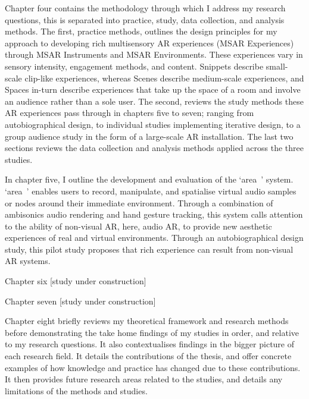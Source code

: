 Chapter four contains the methodology through which I address my research questions, this is separated into practice, study, data collection, and analysis methods. The first, practice methods, outlines the design principles for my approach to developing rich multisensory AR experiences (MSAR Experiences) through MSAR Instruments and MSAR Environments. These experiences vary in sensory intensity, engagement methods, and content. Snippets describe small-scale clip-like experiences, whereas Scenes describe medium-scale experiences, and Spaces in-turn describe experiences that take up the space of a room and involve an audience rather than a sole user. The second, reviews the study methods these AR experiences pass through in chapters five to seven; ranging from autobiographical design, to individual studies implementing iterative design, to a group audience study in the form of a large-scale AR installation. The last two sections reviews the data collection and analysis methods applied across the three studies.
 
In chapter five, I outline the development and evaluation of the ‘area~’ system. ‘area~’ enables users to record, manipulate, and spatialise virtual audio samples or nodes around their immediate environment. Through a combination of ambisonics audio rendering and hand gesture tracking, this system calls attention to the ability of non-visual AR, here, audio AR, to provide new aesthetic experiences of real and virtual environments. Through an autobiographical design study, this pilot study proposes that rich experience can result from non-visual AR systems. 

Chapter six [study under construction]

Chapter seven [study under construction]

Chapter eight briefly reviews my theoretical framework and research methods before demonstrating the take home findings of my studies in order, and relative to my research questions. It also contextualises findings in the bigger picture of each research field. It details the contributions of the thesis, and offer concrete examples of how knowledge and practice has changed due to these contributions. It then provides future research areas related to the studies, and details any limitations of the methods and studies.




\clearpage
%

%  

